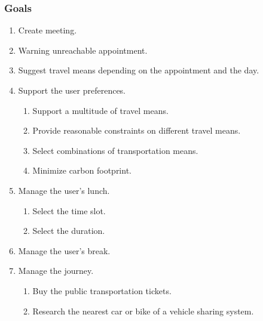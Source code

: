 \subsubsection{Goals}
\renewcommand{\theenumii}{\arabic{enumii}}
\begin{enumerate}
\item
Create meeting.
\item
Warning unreachable appointment.
\item
Suggest travel means depending on the appointment and the day.
\item
Support the user preferences.
	\begin{enumerate}
	\item
	Support a multitude of travel means.
	\item
	Provide reasonable constraints on different travel means.
	\item
	Select combinations of transportation means.
	\item
	Minimize carbon footprint.
	\end{enumerate}
\item
Manage the user's lunch.
	\begin{enumerate}
	\item
	Select the time slot.
	\item
	Select the duration.
	\end{enumerate}
\item
Manage the user's break.
\item
Manage the journey.
	\begin{enumerate}
	\item
	Buy the public transportation tickets.
	\item
	Research the nearest car or bike of a vehicle sharing system.
	\end{enumerate}
\end{enumerate}

